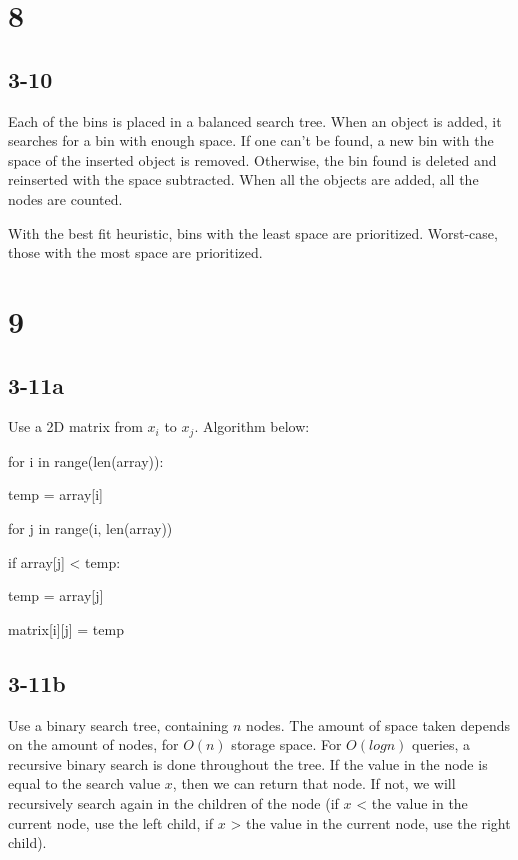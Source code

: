 \documentclass[16pt]{article}
\begin{document}
\section*{8}
\subsection*{3-10}
\noindent Each of the bins is placed in a balanced search tree.  When an object is added, it searches for a bin with enough space.  If one can't be found, a new bin with the space of the inserted object is removed.  Otherwise, the bin found is deleted and reinserted with the space subtracted.  When all the objects are added, all the nodes are counted. \par

\noindent With the best fit heuristic, bins with the least space are prioritized.  Worst-case, those with the most space are prioritized.

\section*{9}
\subsection*{3-11a}
\noindent Use a 2D matrix from $x_{i}$ to $x_{j}$.  Algorithm below: \par
\noindent for i in range(len(array)): \par
\hspace{5mm} temp = array[i] \par
\hspace{5mm} for j in range(i, len(array)) \par
\hspace{10mm} if array[j] < temp: \par
\hspace{15mm} temp = array[j] \par
\hspace{10mm} matrix[i][j] = temp \par

\subsection*{3-11b}
Use a binary search tree, containing $n$ nodes.  The amount of space taken depends on the amount of nodes, for $O(n)$ storage space.  For $O(logn)$ queries, a recursive binary search is done throughout the tree.  If the value in the node is equal to the search value $x$, then we can return that node.  If not, we will recursively search again in the children of the node (if $x$ < the value in the current node, use the left child, if $x$ > the value in the current node, use the right child).
\end{document}
